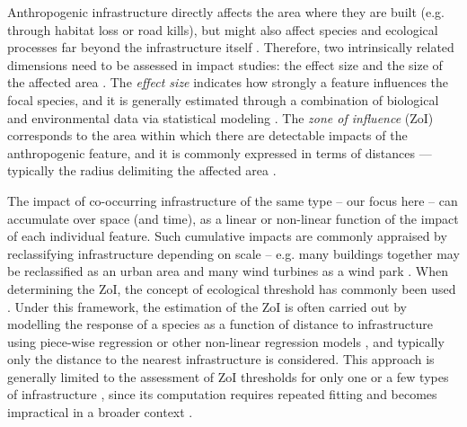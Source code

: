 \documentclass[titlepage]{article}
\begin{document}
Anthropogenic infrastructure directly affects the area where they are built (e.g. through habitat loss or road kills), but might also affect species and ecological processes far beyond the infrastructure itself \citep[e.g. by causing avoidance responses and reducing the probability of animal occurrence in its proximity;][]{johnson_cumulative_2005,torres_assessing_2016,dorber_indicators_2022}. Therefore, two intrinsically related dimensions need to be assessed in impact studies: the effect size and the size of the affected area \citep[Box 1; ][]{naugle_unifying_2011}. The \textit{effect size} indicates how strongly a feature influences the focal species, and it is generally estimated through a combination of biological and environmental data via statistical modeling \citep[Box 1;][]{polfus_identifying_2011}. The \textit{zone of influence} (ZoI) 
corresponds to the area within which there are detectable impacts of the anthropogenic feature, and it is commonly expressed in terms of distances --- typically the radius delimiting the affected area \citep[Box 1;][]{polfus_identifying_2011,boulanger_estimating_2012}. 

The impact of co-occurring infrastructure of the same type -- our focus here -- can accumulate over space (and time), as a 
linear or non-linear function of the impact of each individual feature. Such cumulative impacts are commonly appraised by reclassifying infrastructure depending on scale -- e.g. many buildings together may be reclassified as an urban area and many wind turbines as a wind park \citep{torres_assessing_2016}.
When determining the ZoI, the concept of ecological threshold
has commonly been used \citep[see][and analytical procedures therein]{ficetola_ecological_2009}. Under this framework, the estimation of the ZoI is often carried out by modelling the response of a species as a function of distance to infrastructure using piece-wise regression or other non-linear regression models \citep[e.g. exponential decay or generalized additive models;][]{skarin_out_2018, ficetola_ecological_2009}, and typically only the distance to the nearest infrastructure is considered. This approach is generally limited to the assessment of ZoI thresholds for only one or a few types of infrastructure \citep[e.g.][]{boulanger_estimating_2012}, since its computation requires repeated fitting and becomes impractical in a broader context \citep{lee_estimating_2020}. 
\end{document}
